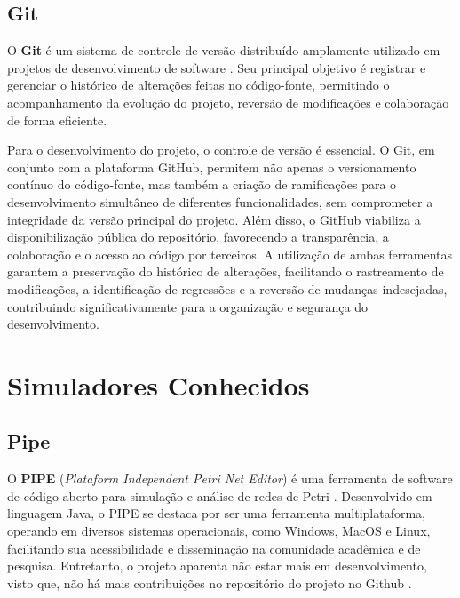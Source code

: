 \documentclass[
	12pt,				%
	openright,			%
	oneside,			%
	a4paper,			%
	english,			%
	brazil				%
	]{abntex2}
\begin{document}
\subsection*{Git} \label{cap:git}

O \textbf{Git} é um sistema de controle de versão distribuído amplamente utilizado em projetos de desenvolvimento de software \cite{git_docs}. Seu principal objetivo é registrar e gerenciar o histórico de alterações feitas no código-fonte, permitindo o acompanhamento da evolução do projeto, reversão de modificações e colaboração de forma eficiente.

Para o desenvolvimento do projeto, o controle de versão é essencial. O Git, em conjunto com a plataforma GitHub, permitem não apenas o versionamento contínuo do código-fonte, mas também a criação de ramificações para o desenvolvimento simultâneo de diferentes funcionalidades, sem comprometer a integridade da versão principal do projeto. Além disso, o GitHub viabiliza a disponibilização pública do repositório, favorecendo a transparência, a colaboração e o acesso ao código por terceiros. A utilização de ambas ferramentas garantem a preservação do histórico de alterações, facilitando o rastreamento de modificações, a identificação de regressões e a reversão de mudanças indesejadas, contribuindo significativamente para a organização e segurança do desenvolvimento.

\section{Simuladores Conhecidos}

\subsection*{Pipe}

O \textbf{PIPE} (\textit{Plataform Independent Petri Net Editor}) é uma ferramenta de software de código aberto para simulação e análise de redes de Petri \cite{Dingle2009PIPE2}. Desenvolvido em linguagem Java, o PIPE se destaca por ser uma ferramenta multiplataforma, operando  em diversos sistemas operacionais, como Windows, MacOS e Linux, facilitando sua acessibilidade e disseminação na comunidade acadêmica e de pesquisa. Entretanto, o projeto aparenta não estar mais em desenvolvimento, visto que, não há mais contribuições no repositório do projeto no Github \cite{PIPEGitHub}. 
\end{document}
